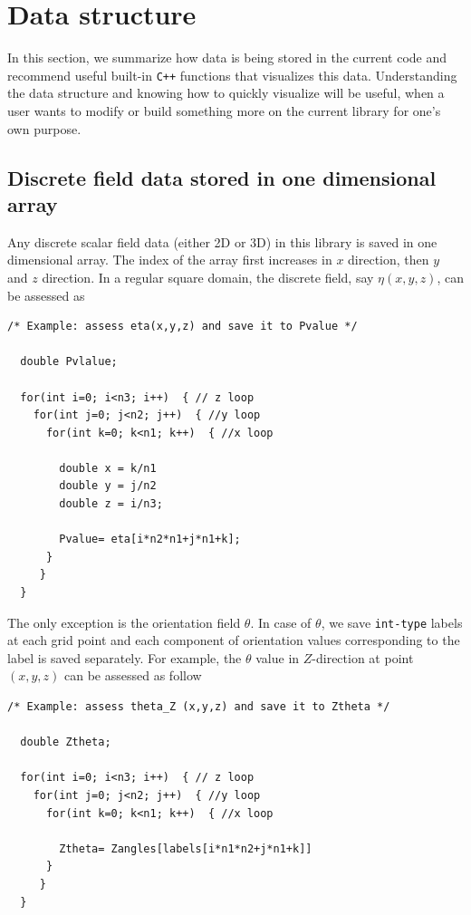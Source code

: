 \documentclass[11pt]{article}
\begin{document}
\section{Data structure}

In this section, we summarize how data is being stored in the current code 
and recommend useful built-in \texttt{C++} functions that visualizes this data. 
Understanding the data structure and knowing how to quickly visualize
will be useful, when a user wants to modify or build something more 
on the current library for one's own purpose. 


\subsection{Discrete field data stored in one dimensional array}
Any discrete scalar field data (either 2D or 3D) in this library is saved in one dimensional array. 
The index of the array first increases in $x$ direction, then $y$ and $z$ direction. 
In a regular square domain, the discrete field, say $\eta(x,y,z)$, can be assessed as 

\begin{tcolorbox}
\begin{lstlisting}[basicstyle=\footnotesize]
  /* Example: assess eta(x,y,z) and save it to Pvalue */

  double Pvlalue;
 
  for(int i=0; i<n3; i++)  { // z loop
    for(int j=0; j<n2; j++)  { //y loop
      for(int k=0; k<n1; k++)  { //x loop
        
        double x = k/n1
        double y = j/n2
        double z = i/n3;
 
        Pvalue= eta[i*n2*n1+j*n1+k]; 
      }
     }
  }
\end{lstlisting}
\end{tcolorbox}

The only exception is the orientation field $\theta$.
In case of $\theta$, we save \texttt{int-type} labels at each grid point
and each component of orientation values corresponding to the label is saved separately. 
For example, the $\theta$ value in $Z$-direction at point $(x,y,z)$ 
can be assessed as follow
\begin{tcolorbox}
\begin{lstlisting}[basicstyle=\footnotesize]
  /* Example: assess theta_Z (x,y,z) and save it to Ztheta */

  double Ztheta;
 
  for(int i=0; i<n3; i++)  { // z loop
    for(int j=0; j<n2; j++)  { //y loop
      for(int k=0; k<n1; k++)  { //x loop
        
        Ztheta= Zangles[labels[i*n1*n2+j*n1+k]] 
      }
     }
  }
\end{lstlisting}
\end{tcolorbox}
\end{document}
